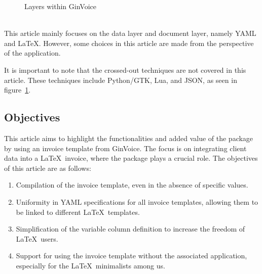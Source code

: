 \noindent
\begin{figure}[!ht]
    \centering
    
    \caption{Layers within GinVoice}\label{fig:scope-bd}
\end{figure}\\
This article mainly focuses on the data layer and document layer, namely YAML and \LaTeX.
However, some choices in this article are made from the perspective of the application.

It is important to note that the crossed-out techniques are not covered in this article.
These techniques include Python/GTK, Lua, and JSON, as seen in figure~\ref{fig:scope-bd}.

\subsection{Objectives}
This article aims to highlight the functionalities and added value of the  package by using an invoice template from GinVoice.
The focus is on integrating client data into a \LaTeX\ invoice, where the  package plays a crucial role.
The objectives of this article are as follows:
\begin{enumerate}
    \item Compilation of the invoice template, even in the absence of specific values.
    \item Uniformity in YAML specifications for all invoice templates, allowing them to be linked to different \LaTeX\ templates.
    \item Simplification of the variable column definition to increase the freedom of \LaTeX\ users.
    \item Support for using the invoice template without the associated application, especially for the \LaTeX\ minimalists among us.
\end{enumerate}
